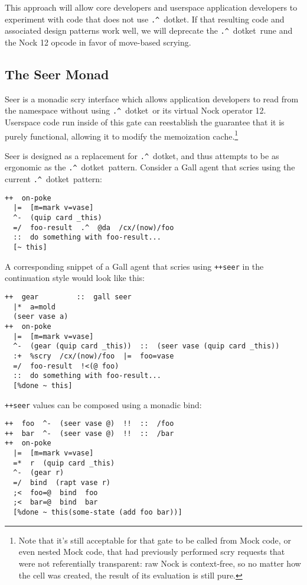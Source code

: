 \documentclass[twoside]{article}
\newcommand{\dotket}{\texttt{\string.\string^}~dotket}
\begin{document}
This approach will allow core developers and userspace application developers to experiment with code that does not use \dotket.  If that resulting code and associated design patterns work well, we will deprecate the \dotket~rune and the Nock 12 opcode in favor of move-based scrying.

\subsection{The Seer Monad}

Seer is a monadic scry interface which allows application developers to read from the namespace without using \dotket~or its virtual Nock operator 12.  Userspace code run inside of this gate can reestablish the guarantee that it is purely functional, allowing it to modify the memoization cache.\footnote{Note that it's still acceptable for that gate to be called from Mock code, or even nested Mock code, that had previously performed scry requests that were not referentially transparent:  raw Nock is context-free, so no matter how the \texttt{} cell was created, the result of its evaluation is still pure.}

Seer is designed as a replacement for \dotket, and thus attempts to be as ergonomic as the \dotket~pattern.  Consider a Gall agent that scries using the current \dotket~pattern:

\begin{lstlisting}
++  on-poke
  |=  [m=mark v=vase]
  ^-  (quip card _this)
  =/  foo-result  .^  @da  /cx/(now)/foo
  ::  do something with foo-result...
  [~ this]
\end{lstlisting}

A corresponding snippet of a Gall agent that scries using \texttt{++seer} in the continuation style would look like this:

\begin{lstlisting}
++  gear         ::  gall seer
  |*  a=mold
  (seer vase a)
++  on-poke
  |=  [m=mark v=vase]
  ^-  (gear (quip card _this))  ::  (seer vase (quip card _this))
  :+  %scry  /cx/(now)/foo  |=  foo=vase
  =/  foo-result  !<(@ foo)
  ::  do something with foo-result...
  [%done ~ this]
\end{lstlisting}

\texttt{++seer} values can be composed using a monadic bind:

\begin{lstlisting}
++  foo  ^-  (seer vase @)  !!  ::  /foo
++  bar  ^-  (seer vase @)  !!  ::  /bar
++  on-poke
  |=  [m=mark v=vase]
  =*  r  (quip card _this)
  ^-  (gear r)
  =/  bind  (rapt vase r)
  ;<  foo=@  bind  foo
  ;<  bar=@  bind  bar
  [%done ~ this(some-state (add foo bar))]
\end{lstlisting}
\end{document}
